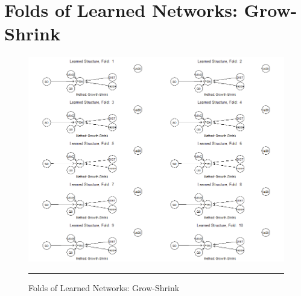 
\chapter{Folds of Learned Networks: Grow-Shrink} %

\label{AppendixC} %

\begin{figure}[htbp]%
	\centering
		\includegraphics[scale=0.5]{Figures/gs.png}
		\rule{35em}{0.5pt}
	\caption[Folds of Learned Networks: Grow-Shrink]{Folds of Learned Networks: Grow-Shrink}
\end{figure}